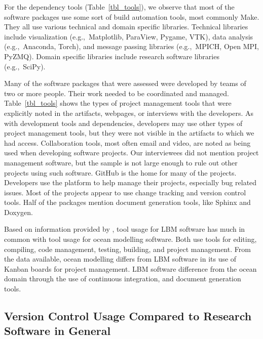 \documentclass[final, 3p, times, authoryear]{elsarticle}
\begin{document}
For the dependency tools (Table~\ref{tbl_tools}), we observe that most of the
software packages use some sort of build automation tools, most commonly Make.
They all use various technical and domain specific libraries. Technical
libraries include visualization (e.g.,\ Matplotlib, ParaView, Pygame, VTK), data
analysis (e.g.,\ Anaconda, Torch), and message passing libraries (e.g.,\ MPICH,
Open MPI, PyZMQ). Domain specific libraries include research software libraries
(e.g.,\ SciPy).

Many of the software packages that were assessed were developed by teams of two
or more people. Their work needed to be coordinated and managed.
Table~\ref{tbl_tools} shows the types of project management tools that were
explicitly noted in the artifacts, webpages, or interviews with the developers.
As with development tools and dependencies, developers may use other types of
project management tools, but they were not visible in the artifacts to which we
had access.  Collaboration tools, most often email and video, are noted as being
used when developing software projects. Our interviewees did not mention project
management software, but the sample is not large enough to rule out other
projects using such software. GitHub is the home for many of the projects.
Developers use the platform to help manage their projects, especially bug
related issues. Most of the projects appear to use change tracking and version
control tools. Half of the packages mention document generation tools, like
Sphinx and Doxygen.

Based on information provided by \citet{JungEtAl2022}, tool usage for
LBM software has much in common with tool usage for ocean modelling
software.  Both use tools for editing, compiling, code management, testing,
building, and project management.  From the data available, ocean modelling
differs from LBM software in its use of Kanban boards for project management.
LBM software difference from the ocean domain through the use of continuous
integration, and document generation tools.

\subsection{Version Control Usage Compared to Research Software in General}
\end{document}
